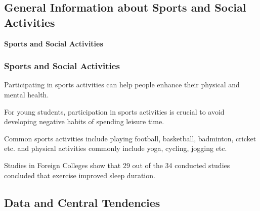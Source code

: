 \documentclass[11pt,]{beamer}
\begin{document}
\subsection{General Information about Sports and Social Activities}

\begin{frame}

    \begin{block}{\textbf{Sports and Social Activities}}
    
    \end{block}
    
\end{frame}

\begin{frame}

	\frametitle{Sports and Social Activities}
	
	Participating in sports activities can help people enhance their physical and mental health. 
	
	\bigskip
	
	For young students, participation in sports activities is crucial to avoid developing negative habits of spending leisure time. 
	
	\bigskip
	
	Common sports activities include playing football, basketball, badminton, cricket etc. and physical activities commonly include yoga, cycling, jogging etc. 
	
	\bigskip
    
	Studies in Foreign Colleges show that 29 out of the 34 conducted studies concluded that exercise improved sleep duration. 
	
\end{frame}

\subsection{Data and Central Tendencies}
\end{document}
